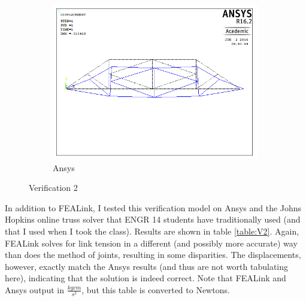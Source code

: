 \documentclass[11pt, oneside]{article}   	%
\begin{document}
\begin{figure}
\begin{subfigure}[b]{.45\textwidth}
   \includegraphics[width=\textwidth]{Verification/Ansys/Verification2.png}
   \caption{Ansys}
   \label{fig:V2Ansys}
  \end{subfigure}
\caption{Verification 2}
\label{fig:Verification2}%
\end{figure}

In addition to FEALink, I tested this verification model on Ansys and the Johns Hopkins online truss solver that ENGR 14 students have traditionally used (and that I used when I took the class).  Results are shown in table \ref{table:V2}.  Again, FEALink solves for link tension in a different (and possibly more accurate) way than does the method of joints, resulting in some disparities.  The displacements, however, exactly match the Ansys results (and thus are not worth tabulating here), indicating that the solution is indeed correct.  Note that FEALink and Ansys output in $\frac{kg cm}{s^2}$, but this table is converted to Newtons.
\end{document}
